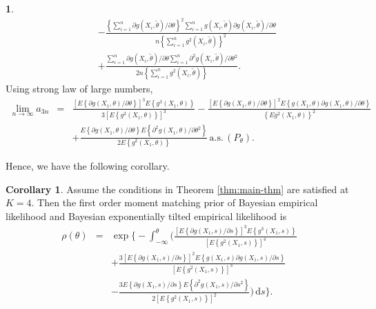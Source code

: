 \documentclass[oneside,english]{amsbook}
\numberwithin{section}{chapter}
\numberwithin{equation}{section}
\numberwithin{figure}{section}
\theoremstyle{plain}
\theoremstyle{plain}
\theoremstyle{definition}
\theoremstyle{plain}
\theoremstyle{plain}
\theoremstyle{remark}
\theoremstyle{definition}
\newtheorem{example}{\protect\examplename}
\newtheorem{corollary}{Corollary}
\theoremstyle{definition}
\newcommand{\diff}{\,\mathrm{d}}
\newcommand{\ascv}{\,\mathrm{a.s.}\,}
\providecommand{\examplename}{Example}
\begin{document}
\begin{example}
\begin{eqnarray*}
 &  & -\frac{\left\{ \sum_{i=1}^{n}\partial g\left(X_{i},\tilde{\theta}\right)/\partial\theta\right\} ^{2}\sum_{i=1}^{n}g\left(X_{i},\tilde{\theta}\right)\partial g\left(X_{i},\tilde{\theta}\right)/\partial\theta}{n\left\{ \sum_{i=1}^{n}g^{2}\left(X_{i},\tilde{\theta}\right)\right\} ^{2}}\\
 &  & +\frac{\sum_{i=1}^{n}\partial g\left(X_{i},\tilde{\theta}\right)/\partial\theta\sum_{i=1}^{n}\partial^{2}g\left(X_{i},\tilde{\theta}\right)/\partial\theta^{2}}{2n\left\{ \sum_{i=1}^{n}g^{2}\left(X_{i},\tilde{\theta}\right)\right\} }.
\end{eqnarray*}
Using strong law of large numbers,
\begin{eqnarray*}
\lim_{n\rightarrow\infty}a_{3n} & = & \frac{\left[E\left\{ \partial g\left(X_{1},\theta \right)/\partial\theta\right\} \right]^{3}E\left\{ g^{3}\left(X_{1},\theta\right)\right\} }{3\left[E\left\{ g^{2}\left(X_{1},\theta\right)\right\} \right]^{3}}-\frac{\left[E\left\{ \partial g\left(X_{1},\theta\right)/\partial\theta\right\} \right]^{2}E\left\{ g\left(X_{1},\theta\right)\partial g\left(X_{1},\theta\right)/\partial\theta\right\} }{\left\{ Eg^{2}\left(X_{1},\theta\right)\right\} ^{2}}\\
 &  & +\frac{E\left\{ \partial g\left(X_{1},\theta\right)/\partial\theta\right\} E\left\{ \partial^{2}g\left(X_{1},\theta\right)/\partial\theta^{2}\right\} }{2E\left\{ g^{2}\left(X_{1},\theta\right)\right\} }\ascv \left (P_{\theta} \right).
\end{eqnarray*}
 \end{example}
 Hence, we have the following corollary.
\begin{corollary}
\label{cor:moment-matching-prior}
Assume the conditions in Theorem \ref{thm:main-thm} are satisfied
at $K=4$. Then the first order moment matching prior of Bayesian
empirical likelihood and Bayesian exponentially tilted empirical likelihood
 is 
\begin{eqnarray*}
\rho\left(\theta\right) & = & \exp\Bigg\{-\int_{-\infty}^{\theta}\Big(\frac{\left[E\left\{ \partial g\left(X_{1},s\right)/\partial s\right\} \right]^{3}E\left\{ g^{3}\left(X_{1},s\right)\right\} }{\left[E\left\{ g^{2}\left(X_{1},s\right)\right\} \right]^{4}}\\
&&+\frac{3\left[E\left\{ \partial g\left(X_{1},s\right)/\partial s\right\} \right]^{2}E\left\{ g\left(X_{1},s\right)\partial g\left(X_{1},s\right)/\partial s\right\} }{\left[E\left\{ g^{2}\left(X_{1},s\right)\right\} \right]^{3}}\\
 &  & -\frac{3E\left\{ \partial g\left(X_{1},s\right)/\partial s\right\} E\left\{\partial^{2}g\left(X_{1},s\right)/\partial s^{2}\right\}}{2\left[E\left\{ g^{2}\left(X_{1},s\right)\right\} \right]^{2}}\Big)\diff s\Bigg\}.
\end{eqnarray*}

\end{corollary}
\end{document}
